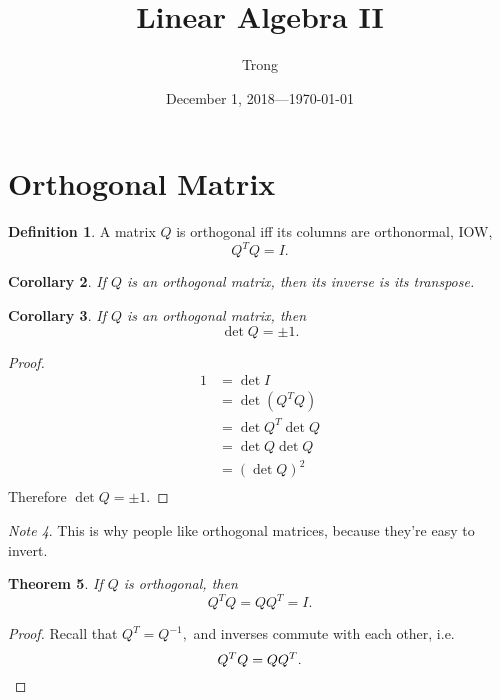 \documentclass[14pt]{extarticle}
\title{Linear Algebra II}
\author{Trong}
\date{December 1, 2018---\today}
\theoremstyle{plain}
\newtheorem{theorem}{Theorem}
\newtheorem{corollary}[theorem]{Corollary}
\theoremstyle{definition}
\newtheorem{definition}[theorem]{Definition}
\theoremstyle{remark}
\newtheorem{note}[theorem]{Note}
\newcommand{\0}{\varnothing}
\newcommand{\<}{\langle}
\renewcommand{\>}{\rangle}
\begin{document}
\sloppy
\maketitle

\tableofcontents


\section{Orthogonal Matrix}

\begin{definition}
  A matrix \( Q \) is orthogonal iff its columns are orthonormal, IOW,
  \[
  Q^{T} Q = I.
  \]
\end{definition}

\begin{corollary}
  If \( Q \) is an orthogonal matrix, then its inverse is its transpose.
\end{corollary}

\begin{corollary}
  If \( Q \) is an orthogonal matrix, then
\[
\det Q = \pm 1.
\]
\end{corollary}

\begin{proof}
  \[
\begin{aligned}
1 &= \det I \\
  &= \det(Q^{T} Q) \\
  &= \det Q^{T} \det Q \\
  &= \det Q \det Q \\
  &= (\det Q)^{2} \\
\end{aligned}
\]
Therefore \( \det Q = \pm 1. \)
\end{proof}

\begin{note}
  This is why people like orthogonal matrices, because they're easy to invert.
\end{note}

\begin{theorem}
  If \( Q \) is orthogonal, then
\[
Q^{T} Q = Q Q^{T} = I.
\]
\end{theorem}

\begin{proof}
  Recall that \( Q^{T} = Q^{-1}, \) and inverses commute with each other, i.e.
\[
Q^{T} Q = Q Q^{T}. \qedhere
\]
\end{proof}
\end{document}
